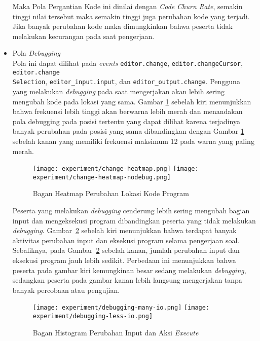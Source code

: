 \begin{itemize}
    Maka Pola Pergantian Kode ini dinilai dengan \textit{Code Churn Rate}, semakin tinggi nilai tersebut maka semakin tinggi juga perubahan kode yang terjadi. Jika banyak perubahan kode maka dimungkinkan bahwa peserta tidak melakukan kecurangan pada saat pengerjaan.

    \item Pola \textit{Debugging} \\
    Pola ini dapat dilihat pada \textit{events} \verb|editor.change|, \verb|editor.changeCursor|, \verb|editor.change|\\\verb|Selection|, \verb|editor_input.input|, dan \verb|editor_output.change|. Pengguna yang melakukan \textit{debugging} pada saat mengerjakan akan lebih sering mengubah kode pada lokasi yang sama. Gambar \ref{fig:5:2:3:heatmapchange} sebelah kiri menunjukkan bahwa frekuensi lebih tinggi akan berwarna lebih merah dan menandakan pola debugging pada posisi tertentu yang dapat dilihat karena terjadinya banyak perubahan pada posisi yang sama dibandingkan dengan Gambar \ref{fig:5:2:3:heatmapchange} sebelah kanan yang memiliki frekuensi maksimum 12 pada warna yang paling merah.

    \begin{figure}[H]
        \centering
        \texttt{[image: experiment/change-heatmap.png]}
        \texttt{[image: experiment/change-heatmap-nodebug.png]}
        \caption{Bagan Heatmap Perubahan Lokasi Kode Program}
        \label{fig:5:2:3:heatmapchange}
    \end{figure}

    Peserta yang melakukan \textit{debugging} cenderung lebih sering mengubah bagian input dan mengeksekusi program dibandingkan peserta yang tidak melakukan \textit{debugging}. Gambar~\ref{fig:5:2:3:debug} sebelah kiri menunjukkan bahwa terdapat banyak aktivitas perubahan input dan eksekusi program selama pengerjaan soal. Sebaliknya, pada Gambar~\ref{fig:5:2:3:debug} sebelah kanan, jumlah perubahan input dan eksekusi program jauh lebih sedikit. Perbedaan ini menunjukkan bahwa peserta pada gambar kiri kemungkinan besar sedang melakukan \textit{debugging}, sedangkan peserta pada gambar kanan lebih langsung mengerjakan tanpa banyak percobaan atau pengujian.

    \begin{figure}[H]
        \centering
        \texttt{[image: experiment/debugging-many-io.png]}
        \texttt{[image: experiment/debugging-less-io.png]}
        \caption{Bagan Histogram Perubahan Input dan Aksi \textit{Execute}}
        \label{fig:5:2:3:debug}
    \end{figure}


\end{itemize}
